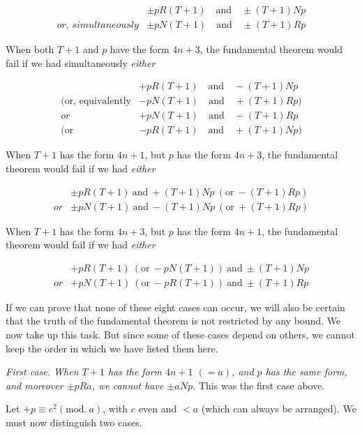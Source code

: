 \[
\begin{array}{ll}&\pm pR(T+1)\quad\text{and}\quad\pm(T+1)Np\\\textit{or, simultaneously}&\pm pN(T+1)\quad\text{and}\quad\pm(T+1)Rp\end{array}
\]

When both $T+1$ and $p$ have the form $4n+3$, the fundamental theorem would fail if we had simultaneously \emph{either}

\[
\begin{array}{ll}&+pR(T+1)\quad\text{and}\quad-(T+1)Np\\\text{(or, equivalently}&-pN(T+1)\quad\text{and}\quad+(T+1)Rp)\\\textit{or}&+pN(T+1)\quad\text{and}\quad-(T+1)Rp\\\text{(or}&-pR(T+1)\quad\text{and}\quad+(T+1)Np)\end{array}
\]

When $T+1$ has the form $4n+1$, but $p$ has the form $4n+3$, the fundamental theorem would fail if we had \emph{either}

\[
\begin{array}{ll}&\pm pR(T+1)\ \text{and}\ +(T+1)Np\ (\text{or}\ -(T+1)Rp)\\\textit{or}&\pm pN(T+1)\ \text{and}\ -(T+1)Np\ (\text{or}\ +(T+1)Rp)\end{array}
\]

When $T+1$ has the form $4n+3$, but $p$ has the form $4n+1$, the fundamental theorem would fail if we had \emph{either}

\[
\begin{array}{ll}&+pR(T+1)\ (\text{or}\ -pN(T+1))\ \text{and}\ \pm(T+1)Np\\\textit{or}&+pN(T+1)\ (\text{or}\ -pR(T+1))\ \text{and}\ \pm(T+1)Rp\end{array}
\]

If we can prove that none of these eight cases can occur, we will also be certain that the truth of the fundamental theorem is not restricted by any bound. We now take up this task. But since some of these cases depend on others, we cannot keep the order in which we have listed them here.

\emph{First case. When $T+1$ has the form $4n+1$ $(=a)$, and $p$ has the same form, and moreover $\pm pRa$, we cannot have $\pm aNp$.} This was the first case above.

Let $+p\equiv e^2(\mathrm{mod.}\ a)$, with $e$ even and $<a$ (which can always be arranged). We must now distinguish two cases.


